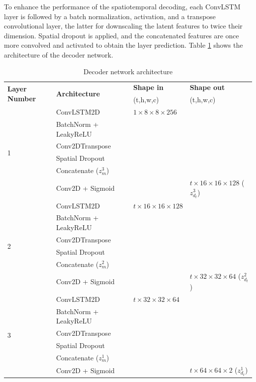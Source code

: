 \documentclass[10pt, twoside]{article}
\begin{document}
To enhance the performance of the spatiotemporal decoding, each ConvLSTM layer is followed by a batch normalization, activation, and a transpose convolutional layer, the latter for downscaling the latent features to twice their dimension. Spatial dropout is applied, and the concatenated features are once more convolved and activated to obtain the layer prediction. Table \ref{tab2} shows the architecture of the decoder network.

\begin{table}[t]
    \caption{Decoder network architecture}\label{tab2}
    \centering
    \begin{tabular}{@{} llll @{} }
    \toprule
        \multirow{2}{*}{\textbf{Layer Number}} & \multirow{2}{*}{\textbf{Architecture}} &
        \textbf{Shape in} & \textbf{Shape out} \\ & & (t,h,w,c) & (t,h,w,c) \\
    \midrule
        \multirow{6}{*}{1} & ConvLSTM2D & $1\times8\times8\times256$ & \\
                           & BatchNorm + LeakyReLU & & \\
                           & Conv2DTranspose       & & \\
                           & Spatial Dropout       & & \\
                           & Concatenate ($z_m^3$) & & \\
                           & Conv2D + Sigmoid      & & $t\times16\times16\times128$ ($z_{d_t}^3$) \\
        \hline                      
        \multirow{6}{*}{2} & ConvLSTM2D & $t\times16\times16\times128$ & \\
                           & BatchNorm + LeakyReLU & & \\
                           & Conv2DTranspose       & & \\
                           & Spatial Dropout       & & \\
                           & Concatenate ($z_m^2$) & & \\
                           & Conv2D + Sigmoid      & & $t\times32\times32\times64$ ($z_{d_t}^2$) \\
        \hline
        \multirow{6}{*}{3} & ConvLSTM2D & $t\times32\times32\times64$ & \\
                           & BatchNorm + LeakyReLU & & \\
                           & Conv2DTranspose       & & \\
                           & Spatial Dropout       & & \\
                           & Concatenate ($z_m^1$) & & \\
                           & Conv2D + Sigmoid      & & $t\times64\times64\times2$ ($z_{d_t}^1$) \\
    \bottomrule
    \end{tabular}
\end{table}
\end{document}

